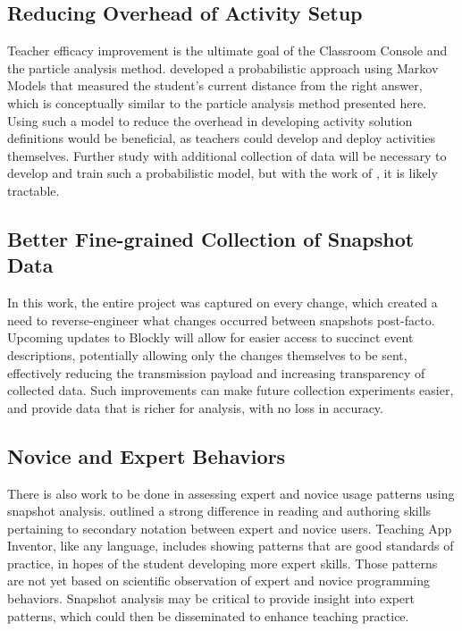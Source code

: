 \subsection{Reducing Overhead of Activity Setup}
Teacher efficacy improvement is the ultimate goal of the Classroom Console and the particle analysis method. \citet{sudol2012calculating} developed a probabilistic approach using Markov Models that measured the student's current distance from the right answer, which is conceptually similar to the particle analysis method presented here. Using such a model to reduce the overhead in developing activity solution definitions would be beneficial, as teachers could develop and deploy activities themselves. Further study with additional collection of data will be necessary to develop and train such a probabilistic model, but with the work of \citet{sudol2012calculating}, it is likely tractable. 

\subsection{Better Fine-grained Collection of Snapshot Data} 
In this work, the entire project was captured on every change, which created a need to reverse-engineer what changes occurred between snapshots post-facto. Upcoming updates to Blockly will allow for easier access to succinct event descriptions, potentially allowing only the changes themselves to be sent, effectively reducing the transmission payload and increasing transparency of collected data. Such improvements can make future collection experiments easier, and provide data that is richer for analysis, with no loss in accuracy. 

\subsection{Novice and Expert Behaviors}
There is also work to be done in assessing expert and novice usage patterns using snapshot analysis. \cite{petre-1995} outlined a strong difference in reading and authoring skills pertaining to secondary notation between expert and novice users. Teaching App Inventor, like any language, includes showing patterns that are good standards of practice, in hopes of the student developing more expert skills. Those patterns are not yet based on scientific observation of expert and novice programming behaviors. Snapshot analysis may be critical to provide insight into expert patterns, which could then be disseminated to enhance teaching practice. 

